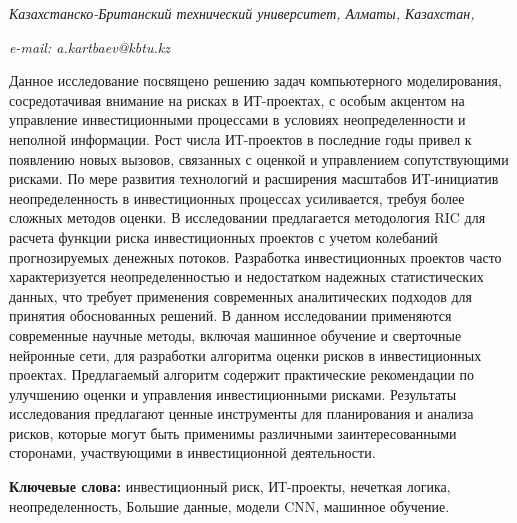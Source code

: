 \begin{affiliation}
\emph{Казахстанско-Британский технический университет, Алматы,
Казахстан,}

\emph{e-mail: a.kartbaev@kbtu.kz}
\end{affiliation}

Данное исследование посвящено решению задач компьютерного моделирования,
сосредотачивая внимание на рисках в ИТ-проектах, с особым акцентом на
управление инвестиционными процессами в условиях неопределенности и
неполной информации. Рост числа ИТ-проектов в последние годы привел к
появлению новых вызовов, связанных с оценкой и управлением
сопутствующими рисками. По мере развития технологий и расширения
масштабов ИТ-инициатив неопределенность в инвестиционных процессах
усиливается, требуя более сложных методов оценки. В исследовании
предлагается методология RIC для расчета функции риска инвестиционных
проектов с учетом колебаний прогнозируемых денежных потоков. Разработка
инвестиционных проектов часто характеризуется неопределенностью и
недостатком надежных статистических данных, что требует применения
современных аналитических подходов для принятия обоснованных решений. В
данном исследовании применяются современные научные методы, включая
машинное обучение и сверточные нейронные сети, для разработки алгоритма
оценки рисков в инвестиционных проектах. Предлагаемый алгоритм содержит
практические рекомендации по улучшению оценки и управления
инвестиционными рисками. Результаты исследования предлагают ценные
инструменты для планирования и анализа рисков, которые могут быть
применимы различными заинтересованными сторонами, участвующими в
инвестиционной деятельности.

{\bfseries Ключевые слова:} инвестиционный риск, ИТ-проекты, нечеткая
логика, неопределенность, Большие данные, модели CNN, машинное обучение.

